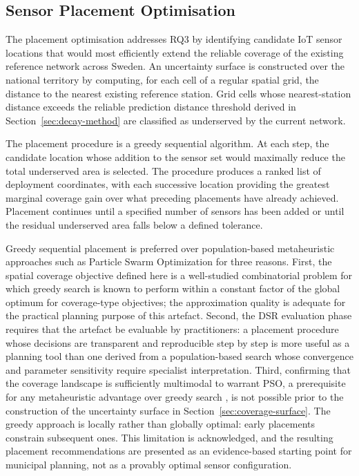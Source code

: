 \documentclass[11pt,a4paper]{article}
\let\oldsubsection\subsection
\renewcommand{\subsection}{\FloatBarrier\oldsubsection}
\begin{document}
\subsection{Sensor Placement Optimisation}
\label{sec:placement-method}

The placement optimisation addresses RQ3 by identifying candidate IoT sensor locations that would most efficiently extend the reliable coverage of the existing reference network across Sweden. An uncertainty surface is constructed over the national territory by computing, for each cell of a regular spatial grid, the distance to the nearest existing reference station. Grid cells whose nearest-station distance exceeds the reliable prediction distance threshold derived in Section~\ref{sec:decay-method} are classified as underserved by the current network.

The placement procedure is a greedy sequential algorithm. At each step, the candidate location whose addition to the sensor set would maximally reduce the total underserved area is selected. The procedure produces a ranked list of deployment coordinates, with each successive location providing the greatest marginal coverage gain over what preceding placements have already achieved. Placement continues until a specified number of sensors has been added or until the residual underserved area falls below a defined tolerance.

Greedy sequential placement is preferred over population-based metaheuristic approaches such as Particle Swarm Optimization for three reasons. First, the spatial coverage objective defined here is a well-studied combinatorial problem for which greedy search is known to perform within a constant factor of the global optimum for coverage-type objectives; the approximation quality is adequate for the practical planning purpose of this artefact. Second, the DSR evaluation phase \cite{peffers_dsr_2007} requires that the artefact be evaluable by practitioners: a placement procedure whose decisions are transparent and reproducible step by step is more useful as a planning tool than one derived from a population-based search whose convergence and parameter sensitivity require specialist interpretation. Third, confirming that the coverage landscape is sufficiently multimodal to warrant PSO, a prerequisite for any metaheuristic advantage over greedy search \cite{gupta_pso_placement_2023, pso_node_deployment_2024}, is not possible prior to the construction of the uncertainty surface in Section~\ref{sec:coverage-surface}. The greedy approach is locally rather than globally optimal: early placements constrain subsequent ones. This limitation is acknowledged, and the resulting placement recommendations are presented as an evidence-based starting point for municipal planning, not as a provably optimal sensor configuration.
\end{document}

